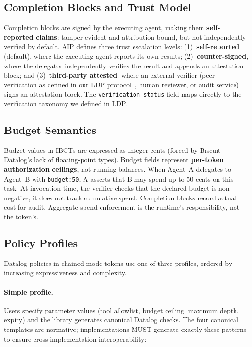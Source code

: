 \documentclass[11pt,a4paper]{article}
\newcommand{\aip}{\textsc{AIP}}
\newcommand{\ibct}{\textsc{IBCT}}
\newcommand{\ldp}{\textsc{LDP}}
\begin{document}
\subsection{Completion Blocks and Trust Model}
\label{sec:completion}

Completion blocks are signed by the executing agent, making them \textbf{self-reported claims}: tamper-evident and attribution-bound, but not independently verified by default. \aip{} defines three trust escalation levels: (1)~\textbf{self-reported} (default), where the executing agent reports its own results; (2)~\textbf{counter-signed}, where the delegator independently verifies the result and appends an attestation block; and (3)~\textbf{third-party attested}, where an external verifier (peer verification as defined in our \ldp{} protocol~\citep{prakash2025ldp}, human reviewer, or audit service) signs an attestation block. The \texttt{verification\_status} field maps directly to the verification taxonomy we defined in \ldp{}.

\subsection{Budget Semantics}
\label{sec:budget}

Budget values in \ibct{}s are expressed as integer cents (forced by Biscuit Datalog's lack of floating-point types). Budget fields represent \textbf{per-token authorization ceilings}, not running balances. When Agent~A delegates to Agent~B with \texttt{budget:50}, A asserts that B may spend up to 50 cents on this task. At invocation time, the verifier checks that the declared budget is non-negative; it does not track cumulative spend. Completion blocks record actual cost for audit. Aggregate spend enforcement is the runtime's responsibility, not the token's.

\subsection{Policy Profiles}
\label{sec:policy}

Datalog policies in chained-mode tokens use one of three profiles, ordered by increasing expressiveness and complexity.

\paragraph{Simple profile.} Users specify parameter values (tool allowlist, budget ceiling, maximum depth, expiry) and the library generates canonical Datalog checks. The four canonical templates are normative; implementations MUST generate exactly these patterns to ensure cross-implementation interoperability:
\end{document}
